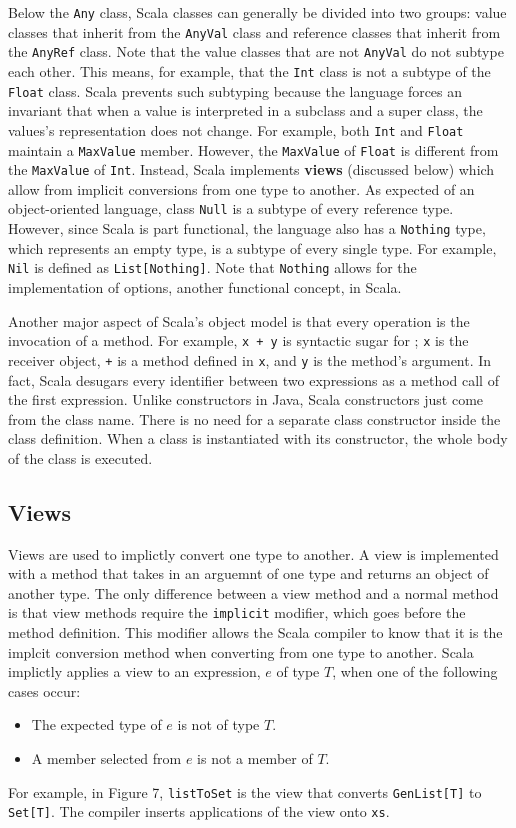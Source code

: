 \documentclass[jou,apacite]{IEEEtran}
\begin{document}
Below the \texttt{Any} class, Scala classes can generally be
divided into two groups: value classes that inherit from the \texttt{AnyVal}
class and reference classes that inherit from the \texttt{AnyRef} class. Note
that the value classes that are not \texttt{AnyVal} do not subtype each
other. This means, for example, that the \texttt{Int} class is not a subtype of
the \texttt{Float} class. Scala prevents such subtyping because the language
forces an invariant that when a value is interpreted in a subclass and a super
class, the values's representation does not change. For example, both
\texttt{Int} and \texttt{Float} maintain a \texttt{MaxValue} member. However,
the \texttt{MaxValue} of \texttt{Float} is different from the \texttt{MaxValue}
of \texttt{Int}. Instead, Scala implements \textbf{views} (discussed below)
which allow from implicit conversions from one type to another. As expected of
an object-oriented language, class \texttt{Null} is a subtype of every reference
type. However, since Scala is part functional, the language also has a
\texttt{Nothing} type, which represents an empty type, is a subtype of every
single type. For example, \texttt{Nil} is defined as
\texttt{List[Nothing]}. Note that \texttt{Nothing} allows for the implementation
of options, another functional concept, in Scala.

Another major aspect of Scala's object model is that every operation is the
invocation of a method. For example, \texttt{x + y} is syntactic sugar for
; \texttt{x} is the receiver object, \texttt{+} is a method defined
in \texttt{x}, and \texttt{y} is the method's argument. In fact, Scala desugars
every identifier between two expressions as a method call of the first
expression. Unlike constructors in Java, Scala constructors just come from the
class name. There is no need for a separate class constructor inside the class
definition. When a class is instantiated with its constructor, the whole body of
the class is executed.

\subsection{Views}
\label{sec:views}
Views are used to implictly convert one type to another. A view is implemented
with a method that takes in an arguemnt of one type and returns an object of
another type. The only difference between a view method and a normal method is
that view methods require the \texttt{implicit} modifier, which goes before the
method definition. This modifier allows the Scala compiler to know that it is
the implcit conversion method when converting from one type to another. Scala
implictly applies a view to an expression, $e$ of type $T$, when one of the
following cases occur:
\begin{itemize}
\item The expected type of $e$ is not of type $T$.
\item A member selected from $e$ is not a member of $T$.
\end{itemize}  
For example, in Figure 7, \texttt{listToSet} is the view that converts \texttt{GenList[T]} to \texttt{Set[T]}. The compiler inserts applications of the view onto \texttt{xs}.
\end{document}
